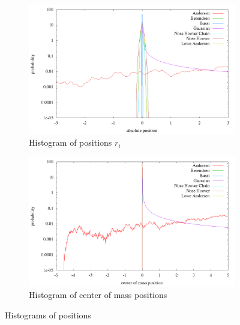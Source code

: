 \begin{figure}[H]
\centering
  \begin{subfigure}[b]{0.5\textwidth}
  	\includegraphics[width=\linewidth]{./graphics/Histogramm_absPosition_rand_T=20_p=64.png}
  	\caption{Histogram of positions $r_i$}
    \label{im:absPos_rand}
  \end{subfigure}\hfill
  \begin{subfigure}[b]{0.5\textwidth}
    \includegraphics[width=\linewidth]{./graphics/Histogramm_schwerPos_rand_T=20_p=64.png}
    \caption{Histogram of center of mass positions}
    \label{im:schwerPos_rand}
  \end{subfigure}
  \caption{Histograms of positions}
\label{fig:pos_rand}
\end{figure}



